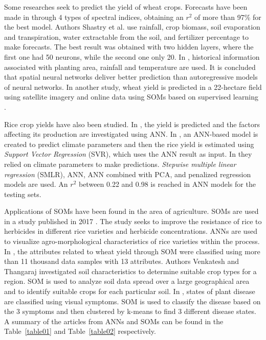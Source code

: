 \documentclass[conference]{IEEEtran}
\begin{document}
Some researches seek to predict the yield of wheat crops. Forecasts have been made in \cite{application_of_panda} through 4 types of spectral indices, obtaining an $r^2$ of more than 97\% for the best model. Authors Shastry et al. \cite{a_parameter_shastry} use rainfall, crop biomass, soil evaporation and transpiration, water extractable from the soil, and fertilizer percentage to make forecasts. The best result was obtained with two hidden layers, where the first one had 50 neurons, while the second one only 20. In \cite{crop_yield_guo}, historical information associated with planting area, rainfall and temperature are used. It is concluded that spatial neural networks deliver better prediction than autoregressive models of neural networks. In another study, wheat yield is predicted in a 22-hectare field using satellite imagery and online data using SOMs based on supervised learning \cite{wheat_yield_pantazi}. 

Rice crop yields have also been studied. In \cite{rice_crop_gandhi}, the yield is predicted and the factors affecting its production are investigated using ANN. In \cite{predicting_rice_hossain}, an ANN-based model is created to predict climate parameters and then the rice yield is estimated using \textit{Support Vector Regression} (SVR), which uses the ANN result as input. In \cite{evaluation_of_bappa} they relied on climate parameters to make predictions. \textit{Stepwise multiple linear regression} (SMLR), ANN, ANN combined with PCA, and penalized regression models are used. An $r^2$ between 0.22 and 0.98 is reached in ANN models for the testing sets.

Applications of SOMs have been found in the area of agriculture. SOMs are used in a study published in 2017 \cite{devoloping_herbicide_sachini}. The study seeks to improve the resistance of rice to herbicides in different rice varieties and herbicide concentrations. ANNs are used to visualize agro-morphological characteristics of rice varieties within the process. In \cite{the_self_organazing_mokarram}, the attributes related to wheat yield through SOM were classified using more than 11 thousand data samples with 13 attributes. Authors Venkatesh and Thangaraj \cite{self_organazing_venkatesh} investigated soil characteristics to determine suitable crop types for a region. SOM is used to analyze soil data spread over a large geographical area and to identify suitable crops for each particular soil. In \cite{artificial_neural_Waidyarathne}, states of plant disease are classified using visual symptoms. SOM is used to classify the disease based on the 3 symptoms and then clustered by k-means to find 3 different disease states. A summary of the articles from ANNs and SOMs can be found in the Table~\ref{table01} and Table~\ref{table02} respectively. 
\end{document}
